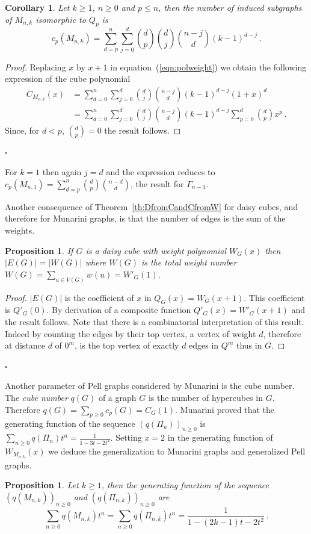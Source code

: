 \documentclass[11pt]{article}
\newtheorem{corollary}[theorem]{\bf Corollary}
\newtheorem{proposition}[theorem]{\bf Proposition}
\newcommand{\qed}{\hfill $\square$ \bigskip}
\begin{document}
\begin{corollary}\label{co:ndQp}
Let $k\geq 1$, $n\geq 0$  and $p\leq n$, then the number of induced subgraphs  of $M_{n,k}$ isomorphic to $Q_p$ is
\begin{equation*}
 c_p(M_{n,k})=\sum_{d=p}^n{\sum_{j=0}^d{\binom{d}{p}{\binom{d}{j}\binom{n-j}{d}(k-1)^{d-j}}}}\,.
\end{equation*}
\end{corollary}
\begin{proof}
Replacing $x$ by $x+1$ in equation~(\ref{eqn:polweight}) we obtain the following expression of the cube polynomial
\begin{align*}\label{eqn:pol}
 C_{M_{n,k}}(x)&=\sum_{d=0}^{n}{\sum_{j= 0}^{d}{\binom{d}{j}\binom{n-j}{d}(k-1)^{d-j}}(1+x)^d}\\
&=\sum_{d=0}^{n}{\sum_{j= 0}^{d}{\binom{d}{j}\binom{n-j}{d}(k-1)^{d-j}}\sum_{p=0}^{d}{\binom{d}{p}}x^p}\,.
\end{align*}
Since, for $d<p$, $\binom{d}{p}=0$ the result follows. 

\end{proof}\qed

For $k=1$ then again $j=d$ and the expression reduces to $c_p(M_{n,1})=\sum_{d=p}^n\binom{d}{p}\binom{n-d}{d}$, the result for $\Gamma_{n-1}$\cite[Corollary 3.3]{KM-2012a}.

Another consequence of Theorem~\ref{th:DfromCandCfromW} for daisy cubes, and therefore  for Munarini graphs, is that the number of edges is the sum of the weights.
\begin{proposition}
If $G$ is a daisy cube with weight polynomial $W_G(x)$ then $|E(G)|= |W(G)|$ where $W(G)$ is the total weight number $W(G)=\sum_{u\in V(G)}w(u)=W'_G(1)$.
\end{proposition}
\begin{proof}
$|E(G)|$ is the coefficient of $x$ in $Q_G(x)=W_G(x+1)$. This coefficient is $Q'_G(0)$. By derivation of a composite function $Q'_G(x)=W'_G(x+1)$ and the result follows.
Note that there is a combinatorial interpretation of this result. Indeed by counting the edges by their top vertex, a vertex of weight $d$, therefore at distance $d$ of $0^m$,  is the top vertex of exactly $d$ edges in $Q^m$ thus in $G$.
\end{proof}\qed

Another parameter of Pell graphs considered by Munarini is the cube number.
The \emph{cube number } $q(G)$ of a graph $G$ is the number of hypercubes in $G$. Therefore   $q(G)=\sum_{p\geq0}c_p(G)=C_G(1)$. Munarini proved \cite[Proposition~22]{M-2019} that the generating function of the sequence $(q(\Pi_n))_{n\geq 0}$ is $\sum_{n\geq0}{q(\Pi_n)t^n}=\frac{1}{1-3t-2t^2}$. Setting  $x=2$ in the generating function of $W_{M_{n,k}}(x)$ we deduce the generalization to Munarini graphs and generalized Pell graphs.
\begin{proposition}
Let $k\geq1$, then the generating function of the sequence $(q(M_{n,k}))_{n \geq 0}$ and $(q(\Pi_{n,k}))_{n \geq 0}$ are
$$ \sum_{n\geq0}{q(M_{n,k})t^n}=\sum_{n\geq0}{q(\Pi_{n,k})t^n}=\frac{1}{1-(2k-1)t -2t^2}\,.$$
\end{proposition}
\end{document}
